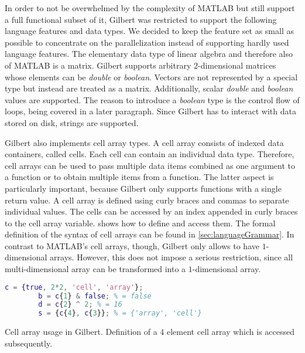 In order to not be overwhelmed by the complexity of MATLAB but still support a full functional subset of it, Gilbert was restricted to support the following language features and data types.
We decided to keep the feature set as small as possible to concentrate on the parallelization instead of supporting hardly used language features.
The elementary data type of linear algebra and therefore also of MATLAB is a matrix.
Gilbert supports arbitrary $2$-dimensional matrices whose elements can be \emph{double} or \emph{boolean}.
Vectors are not represented by a special type but instead are treated as a matrix.
Additionally, scalar \emph{double} and \emph{boolean} values are supported.
The reason to introduce a \emph{boolean} type is the control flow of loops, being covered in a later paragraph.
Since Gilbert has to interact with data stored on disk, strings are supported.

Gilbert also implements cell array types.
A cell array consists of indexed data containers, called cells.
Each cell can contain an individual data type.
Therefore, cell arrays can be used to pass multiple data items combined as one argument to a function or to obtain multiple items from a function.
The latter aspect is particularly important, because Gilbert only supports functions with a single return value.
A cell array is defined using curly braces and commas to separate individual values.
The cells can be accessed by an index appended in curly braces to the cell array variable.
 shows how to define and access them.
The formal definition of the syntax of cell arrays can be found in \cref{sec:languageGrammar}.
In contrast to MATLAB's cell arrays, though, Gilbert only allows to have $1$-dimensional arrays.
However, this does not impose a serious restriction, since all multi-dimensional array can be transformed into a $1$-dimensional array. 

\begin{listing}[!h]
	\begin{CenteredBox}
		\begin{lstlisting}[language=Matlab]
		c = {true, 2*2, 'cell', 'array'};
		b = c{1} & false; % = false
		d = c{2} ^ 2; % = 16
		s = {c{4}, c{3}}; % = {'array', 'cell'} 
		\end{lstlisting}
	\end{CenteredBox}
	\caption{Cell array usage in Gilbert. Definition of a 4 element cell array which is accessed subsequently.}
	\label{lst:cellArray}
\end{listing}

